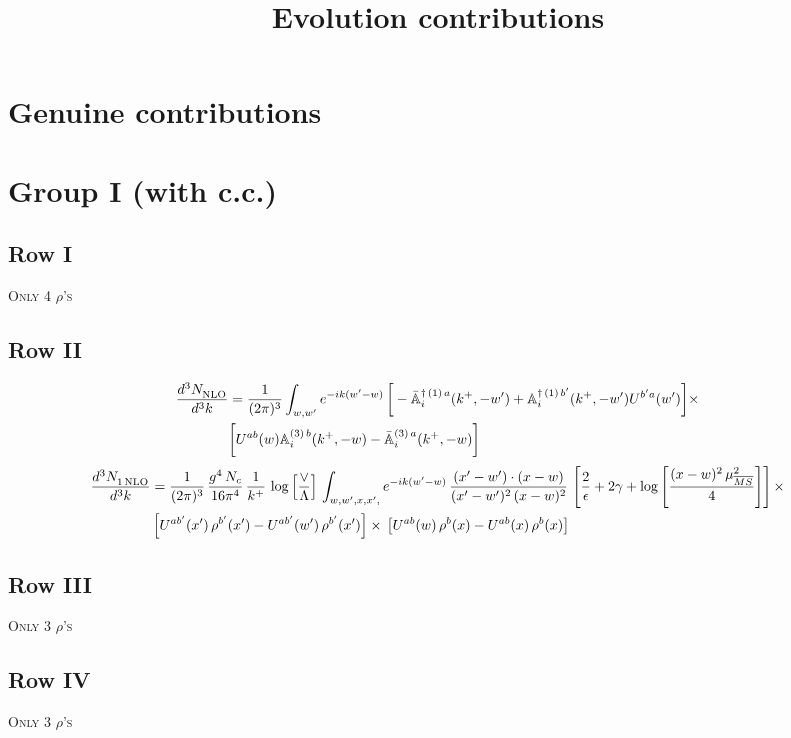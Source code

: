 \documentclass[9pt]{article}
\title{Evolution contributions}
\author{}
\date{}
\def\mf#1{\mathbb{#1}}
\numberwithin{equation}{section}
\begin{document}
\maketitle
\section{Genuine contributions}
\section{Group I (with c.c.)}
\subsection{Row I}
\textsc{Only 4 $\rho$'s}
\subsection{Row II}
\begin{align}
    \frac{d^{3}N_{\rm NLO}^{\rm}}{d^{3}k} &  = \frac{1}{(2\pi)^{3}}  \int_{w, w^\prime} e^{-ik(w^\prime-w)}\,\bigg[-\bar{\mf{A}}^{\dagger\,(1)\,a}_{i}(k^{+},-w^{\prime})+\mf{A}^{\dagger\, (1)\, b^{\prime}}_{i}(k^{+},-w^{\prime})U^{b^{\prime}a}(w^{\prime})\bigg]\times \notag \\ & \bigg[U^{ab}(w)\mf{A}^{(3)\, b}_{i}(k^{+},- w)-\Bar{\mf{A}}^{(3)\, a}_{i}(k^{+}, - w)\bigg]\nonumber
\end{align}
\begin{align}
     \frac{d^{3}N_{1\,\rm NLO}^{\rm}}{d^{3}k} &  = \frac{1}{(2\pi)^{3}}\, \frac{g^{4}\,N_{c}}{16\pi^{4}}\,\frac{1}{k^{+}}\,\log{\left[\frac{\vee}{\Lambda}\right]}\, \int_{w, w',x,x',} e^{-ik(w^\prime-w)}\, \frac{(x'-w')\cdot (x-w)}{(x'-w')^{2}\, (x-w)^{2}}\, \left[\frac{2}{\epsilon}+2\gamma+\log{\left[\frac{(x-w)^{2}\,\mu^{2}_{\overline{MS}}}{4}\right]}\right] \times\notag \\ & \left[U^{ab'}(x')\,\rho^{b'}(x') - U^{ab'}(w')\,\rho^{b'}(x')\right]\times\,\left[U^{ab}(w)\,\rho^{b}(x) - U^{ab}(x)\,\rho^{b}(x)\right]
\end{align}
\subsection{Row III}
\textsc{Only 3 $\rho$'s}
\subsection{Row IV}
\textsc{Only 3 $\rho$'s}
\end{document}
